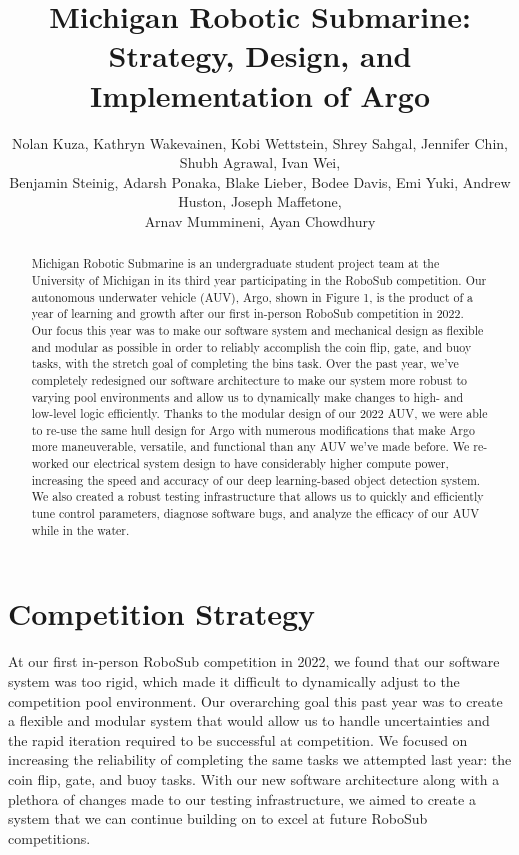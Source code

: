 \documentclass[conference]{IEEEtran}
\begin{document}
\title{Michigan Robotic Submarine: Strategy, Design, and Implementation of Argo}
\author{Nolan Kuza, Kathryn Wakevainen, Kobi Wettstein, Shrey Sahgal, Jennifer Chin, Shubh Agrawal, Ivan Wei,  \\  Benjamin Steinig,  Adarsh Ponaka, Blake Lieber, Bodee Davis, Emi Yuki, Andrew Huston, Joseph Maffetone, \\ Arnav Mummineni, Ayan Chowdhury
}

\maketitle
\pagestyle{fancy}
\rhead{\thepage}

\begin{abstract}
Michigan Robotic Submarine is an undergraduate student project team at the University of Michigan in its third year participating in the RoboSub competition. Our autonomous underwater vehicle (AUV), Argo, shown in Figure 1, is the product of a year of learning and growth after our first in-person RoboSub competition in 2022. Our focus this year was to make our software system and mechanical design as flexible and modular as possible in order to reliably accomplish the coin flip, gate, and buoy tasks, with the stretch goal of completing the bins task. Over the past year, we've completely redesigned our software architecture to make our system more robust to varying pool environments and allow us to dynamically make changes to high- and low-level logic efficiently. Thanks to the modular design of our 2022 AUV, we were able to re-use the same hull design for Argo with numerous modifications that make Argo more maneuverable, versatile, and functional than any AUV we've made before. We re-worked our electrical system design to have considerably higher compute power, increasing the speed and accuracy of our deep learning-based object detection system. We also created a robust testing infrastructure that allows us to quickly and efficiently tune control parameters, diagnose software bugs, and analyze the efficacy of our AUV while in the water.
\end{abstract}

\section{Competition Strategy}
\label{sec:comp_strat}
At our first in-person RoboSub competition in 2022, we found that our software system was too rigid, which made it difficult to dynamically adjust to the competition pool environment. Our overarching goal this past year was to create a flexible and modular system that would allow us to handle uncertainties and the rapid iteration required to be successful at competition. We focused on increasing the reliability of completing the same tasks we attempted last year: the coin flip, gate, and buoy tasks. With our new software architecture along with a plethora of changes made to our testing infrastructure, we aimed to create a system that we can continue building on to excel at future RoboSub competitions.
\end{document}
